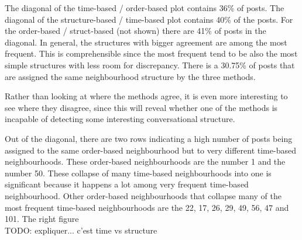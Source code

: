 \documentclass[conference]{IEEEtran}
\begin{document}
The diagonal of the time-based / order-based plot contains 36\% of posts. The diagonal of the structure-based / time-based plot contains 40\% of the posts. For the order-based / struct-based (not shown) there are 41\% of posts in the diagonal. In general, the structures with bigger agreement are among the most frequent. This is comprehensible since the most frequent tend to be also the most simple structures with less room for discrepancy. There is a 30.75\% of posts that are assigned the same neighbourhood structure by the three methods. 

Rather than looking at where the methods agree, it is even more interesting to see where they disagree, since this will reveal whether one of the methods is incapable of detecting some interesting conversational structure. 



Out of the diagonal, there are two rows indicating a high number of posts being assigned to the same order-based neighbourhood but to very different time-based neighbourhoods. These order-based neighbourhoods are the number 1 and the number 50. These collapse of many time-based neighbourhoods into one is significant because it happens a lot among very frequent time-based neighbourhood. Other order-based neighbourhoods that collapse many of the most frequent time-based neighbourhoods are the 22, 17, 26, 29, 49, 56, 47 and 101. 
The right figure \\TODO: expliquer... c'est time vs structure
\end{document}
